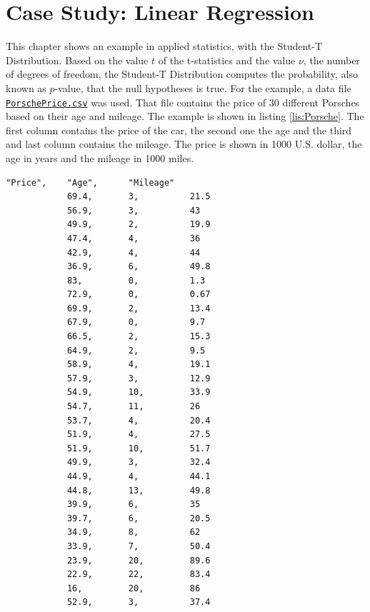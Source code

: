 
\chapter{Case Study: Linear Regression}


	This chapter shows an example in applied statistics, with the Student-T Distribution. Based on the value $t$ of the t-statistics and the value $\nu$, the number of degrees of freedom, the Student-T Distribution computes the probability, also known as $p$-value, that the null hypotheses is true. For the example, a data file \href{https://vincentarelbundock.github.io/Rdatasets/csv/Stat2Data/PorschePrice.csv}{\lstinline{PorschePrice.csv}} was used. That file contains the price of 30 different Porsches based on their age and mileage. The example is shown in listing \ref{lis:Porsche}. The first column contains the price of the car, the second one the age and the third and last column contains the mileage. The price is shown in 1000 U.S. dollar, the age in years and the mileage in 1000 miles.

	\begin{center}
		\begin{lstlisting}[caption={\lstinline{PorschePrice.csv} Example}, label={lis:Porsche}]
			"Price",	"Age",		"Mileage"
			69.4,		3,			21.5
			56.9,		3,			43
			49.9,		2,			19.9
			47.4,		4,			36
			42.9,		4,			44
			36.9,		6,			49.8
			83,			0,			1.3
			72.9,		0,			0.67
			69.9,		2,			13.4
			67.9,		0,			9.7
			66.5,		2,			15.3
			64.9,		2,			9.5
			58.9,		4,			19.1
			57.9,		3,			12.9
			54.9,		10,			33.9
			54.7,		11,			26
			53.7,		4,			20.4
			51.9,		4,			27.5
			51.9,		10,			51.7
			49.9,		3,			32.4
			44.9,		4,			44.1
			44.8,		13,			49.8
			39.9,		6,			35
			39.7,		6,			20.5
			34.9,		8,			62
			33.9,		7,			50.4
			23.9,		20,			89.6
			22.9,		22,			83.4
			16,			20,			86
			52.9,		3,			37.4
		\end{lstlisting}
	\end{center}


